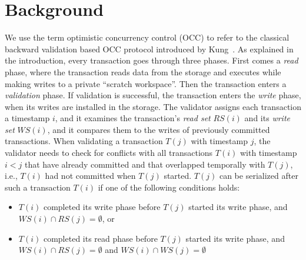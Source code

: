 \section{Background}\label{sec:background}

We use the term optimistic concurrency control (OCC) to refer to the classical backward validation based OCC protocol introduced by Kung~\cite{kung81tods}.
As explained in the introduction, every transaction goes through three phases. First comes a \emph{read} phase, where the transaction reads data from the storage and executes while making writes to a private ``scratch workspace''. Then the transaction enters a \emph{validation} phase. If validation is successful, the transaction enters the \emph{write} phase, when its writes are installed in the storage. 
The validator assigns each transaction a timestamp $i$, and it examines the transaction's \emph{read set} $RS(i)$ and its \emph{write set} $WS(i)$, and it compares them to the writes of previously committed transactions. 
When validating a transaction $T(j)$ with timestamp $j$, the validator needs to check for conflicts with all transactions $T(i)$ with timestamp $i<j$ that have already committed and that overlapped temporally with $T(j)$, i.e., $T(i)$ had not committed when $T(j)$ started. 
$T(j)$ can be serialized after such a transaction $T(i)$ if one of the following conditions holds:
\begin{itemize}[leftmargin=*]
\vspace{-.8em}
\item $T(i)$ completed its write phase before $T(j)$ started its write phase, and $WS(i) \cap RS(j) = \emptyset$, or
\vspace{-.8em}
\item $T(i)$ completed its read phase before $T(j)$ started its write phase, and $WS(i) \cap RS(j) = \emptyset$ and $WS(i) \cap WS(j) = \emptyset$
\vspace{-.5em}
\end{itemize}
